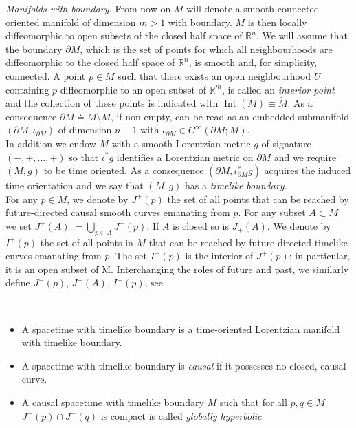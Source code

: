 \noindent\emph{Manifolds with boundary.} From now on $M$ will denote a smooth connected oriented manifold of dimension $m>1$ with boundary. $M$ is then locally diffeomorphic to open subsets of the closed half space of $\mathbb{R}^n$. We will assume that the boundary $\partial M$, which is the set of points for which all neighbourhoods are diffeomorphic to the closed half space of $\mathbb{R}^n$, is smooth and, for simplicity, connected. A point $p\in M$ such that there exists an open neighbourhood $U$ containing $p$ diffeomorphic to an open subset of $\mathbb{R}^m$, is called an {\em interior point} and the collection of these points is indicated with $\operatorname{Int}(M)\equiv\mathring{M}$. As a consequence $\partial M\doteq M\setminus\mathring{M}$, if non empty, can be read as an embedded submanifold $(\partial M,\iota_{\partial M})$ of dimension $n-1$ with $\iota_{\partial M}\in C^\infty(\partial M; M)$.\\
In addition we endow $M$ with a smooth Lorentzian metric $g$ of signature $(-,+,...,+)$ so that $\iota^*g$ identifies a Lorentzian metric on $\partial M$ and we require $(M,g)$ to be time oriented. As a consequence $(\partial M,\iota^*_{\partial M}g)$ acquires the induced time orientation and we say that $(M,g)$ has a {\em timelike boundary}.\\

For any $p \in M$, we denote by $J^+(p)$ the set of all points that can be reached by future-directed causal smooth curves emanating from $p$. For any subset $A \subset M$ we set $J^+ (A) := \bigcup_{p\in A} J^+ (p)$. If $A$ is closed so is $J _+ (A)$.
We denote by $I^+ (p)$ the set of all points in $M$ that can be reached by future-directed timelike curves emanating from $p$. The set $I^+ (p)$ is the interior of $J^+ (p)$; in particular, it is an open subset of M. Interchanging the roles of future and past, we similarly define $J^- (p)$, $J^- (A)$, $I^- (p)$, see 

\begin{Definition}\label{Def: spacetime timelike boundary}\hfill\\
	\vspace{-0.6cm}
	\begin{itemize}
	\item A spacetime with timelike boundary is a time-oriented Lorentzian manifold with timelike boundary.
	\item A spacetime with timelike boundary is {\em causal} if it possesses no closed, causal curve.
	\item A causal spacetime with timelike boundary $M$ such that for all $p,q\in M$ $J^+(p)\cap J^-(q)$ is compact is called \emph{globally hyperbolic}.
	\end{itemize}
\end{Definition}

